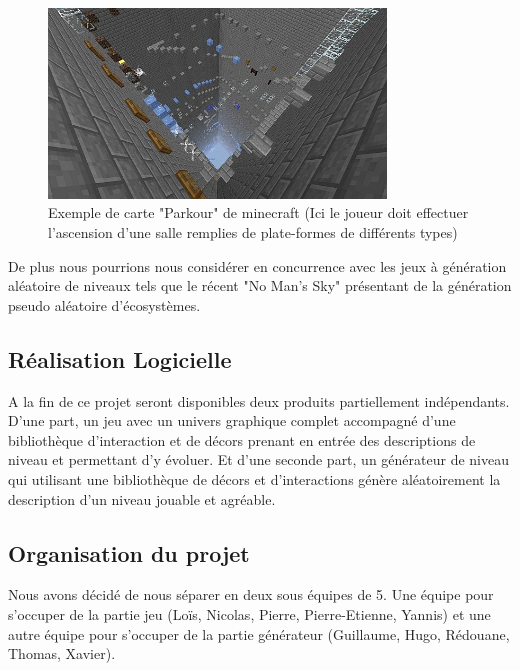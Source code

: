 \documentclass[12pt]{article}
\begin{document}
        \begin{figure}[h]
        \begin{center}
            \includegraphics[width=0.8\textwidth]{minecraft.jpg}
                \caption{Exemple de carte "Parkour" de minecraft (Ici le joueur doit effectuer l'ascension d'une salle remplies de plate-formes de différents types)}
        \end{center}
        \end{figure}
        
        De plus nous pourrions nous considérer en concurrence avec les jeux à génération aléatoire de niveaux tels que le récent "No Man's Sky" présentant de la génération pseudo aléatoire d'écosystèmes.
        
    \subsection{Réalisation Logicielle}
        A la fin de ce projet seront disponibles deux produits partiellement indépendants. D'une part, un jeu avec un univers graphique complet accompagné d'une bibliothèque d'interaction et de décors prenant en entrée des descriptions de niveau et permettant d'y évoluer.
        Et d'une seconde part, un générateur de niveau qui utilisant une bibliothèque de décors et d'interactions génère aléatoirement la description d'un niveau jouable et agréable.
        
    \subsection{Organisation du projet}
        Nous avons décidé de nous séparer en deux sous équipes de 5. Une équipe pour s'occuper de la partie jeu (Loïs, Nicolas, Pierre, Pierre-Etienne, Yannis) et une autre équipe pour s'occuper de la partie générateur (Guillaume, Hugo, Rédouane, Thomas, Xavier).
        
\end{document}

